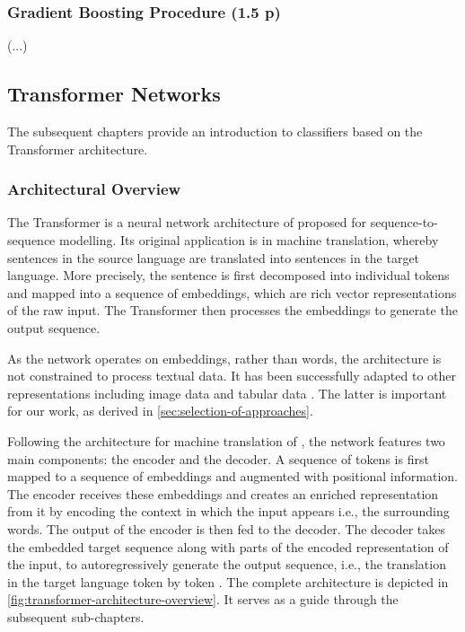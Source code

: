 \subsubsection{Gradient Boosting
    Procedure (1.5 p)}\label{sec:gradient-boosting-procedure}
(...)

\subsection{Transformer Networks}\label{sec:transformer-networks}

The subsequent chapters provide an introduction to classifiers based on the Transformer architecture.

\subsubsection{Architectural Overview}\label{sec:architectural-overview}

The Transformer is a neural network architecture of \textcite[][6002--6006]{vaswaniAttentionAllYou2017} proposed for sequence-to-sequence modelling. Its original application is in machine translation, whereby sentences in the source language are translated into sentences in the target language. More precisely, the sentence is first decomposed into individual \glspl{token} and mapped into a sequence of \glspl{embedding}, which are rich vector representations of the raw input. The Transformer then processes the \glspl{embedding} to generate the output sequence.

As the network operates on \glspl{embedding}, rather than words, the architecture is not constrained to process textual data. It has been successfully adapted to other representations including image data \autocites[][2--5]{parmarImageTransformer2018}[][3]{dosovitskiyImageWorth16x162021} and tabular data \autocite[cp.][18932]{gorishniyRevisitingDeepLearning2021}. The latter is important for our work, as derived in \cref{sec:selection-of-approaches}.

Following the architecture for machine translation of \textcite[][3]{sutskeverSequenceSequenceLearning2014}, the network features two main components: the encoder and the decoder. A sequence of \glspl{token} is first mapped to a sequence of \glspl{embedding} and augmented with positional information. The encoder receives these \glspl{embedding} and creates an enriched representation from it by encoding the context in which the input appears i.e., the surrounding words. The output of the encoder is then fed to the decoder. The decoder takes the embedded target sequence along with parts of the encoded representation of the input, to autoregressively generate the output sequence, i.e., the translation in the target language \gls{token} by \gls{token} \autocite[][3]{vaswaniAttentionAllYou2017}. The complete architecture is depicted in \cref{fig:transformer-architecture-overview}. It serves as a guide through the subsequent sub-chapters.

